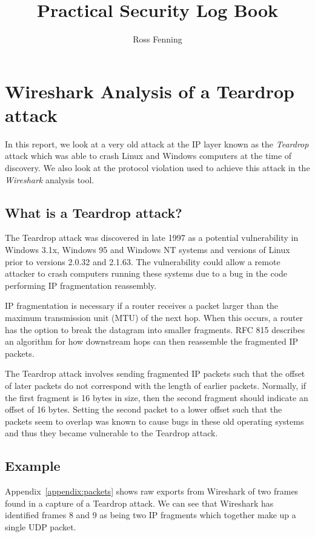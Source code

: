\documentclass{report}
\title{Practical Security Log Book}
\author{Ross Fenning}
\begin{document}
\maketitle
\tableofcontents

\chapter{Wireshark Analysis of a Teardrop attack}

In this report, we look at a very old attack at the IP layer
known as the \emph{Teardrop} attack which was able to crash
Linux and Windows computers at the time of discovery.
We also look at the protocol violation used to achieve this attack
in the \emph{Wireshark} analysis tool.

\section{What is a Teardrop attack?}

The Teardrop attack \parencite{center1997cert} was discovered
in late 1997 as a potential vulnerability in Windows 3.1x, Windows 95 and Windows NT
systems and versions of Linux prior to versions 2.0.32 and 2.1.63.
The vulnerability could allow a remote attacker to crash computers
running these systems due to a bug in the code performing IP fragmentation
reassembly.

IP fragmentation \parencite{postel1981rfc,fall2011tcp} is necessary if a router
receives a packet larger than the maximum transmission unit (MTU) of the
next hop. When this occurs, a router has the option to break the datagram
into smaller fragments. RFC 815 \parencite{clark1982ip} describes
an algorithm for how downstream hops can then reassemble the fragmented
IP packets.

The Teardrop attack involves sending fragmented IP packets such that the offset
of later packets do not correspond with the length of earlier packets. Normally,
if the first fragment is 16 bytes in size, then the second fragment should
indicate an offset of 16 bytes. Setting the second packet to a lower
offset such that the packets seem to overlap was known to cause bugs in
these old operating systems and thus they became vulnerable to the Teardrop
attack.

\section{Example}

Appendix~\ref{appendix:packets} shows raw exports from Wireshark of two frames
found in a capture of a Teardrop attack. We can see that Wireshark has identified
frames 8 and 9 as being two IP fragments which together make up a single UDP
packet.
\end{document}
